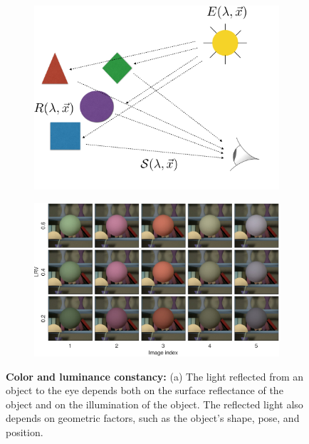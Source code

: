 \documentclass{jov}
\begin{document}
\begin{figure}
\centering
\begin{subfigure}{0.4 \textwidth}
	\centering
	\caption{}
        \includegraphics[width=\textwidth]{../FiguresDraft5/Figure1/Figure1_a.png}
        \label{fig:introSchematic}
    \end{subfigure}
    \begin{subfigure}{0.55 \textwidth}   
        \caption{}    
        \includegraphics[width=\textwidth]{../FiguresDraft5/Figure1/Figure1_b.pdf}
        \label{fig:introExampleFigure}
    \end{subfigure}
    \label{introFigure}
    \caption{{\bf Color and luminance constancy:} (a)  The light reflected from an object to the eye depends both on the surface reflectance of the object and on the illumination of the object. 
The reflected light also depends on geometric factors, such as the object's shape, pose, and position. 
}
\end{figure}
\end{document}
